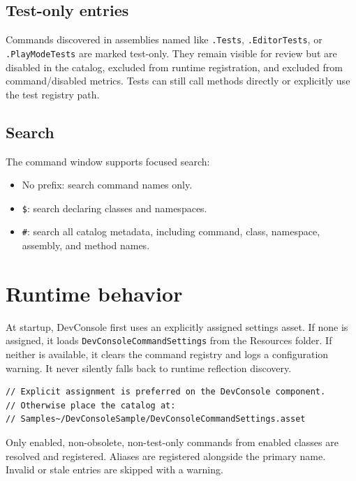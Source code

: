 \documentclass[11pt,a4paper]{article}
\begin{document}
\subsection{Test-only entries}

Commands discovered in assemblies named like \texttt{.Tests}, \texttt{.EditorTests}, or \texttt{.PlayModeTests} are marked test-only. They remain visible for review but are disabled in the catalog, excluded from runtime registration, and excluded from command/disabled metrics. Tests can still call methods directly or explicitly use the test registry path.

\subsection{Search}

The command window supports focused search:

\begin{itemize}[leftmargin=*]
  \item No prefix: search command names only.
  \item \texttt{\$}: search declaring classes and namespaces.
  \item \texttt{\#}: search all catalog metadata, including command, class, namespace, assembly, and method names.
\end{itemize}

\section{Runtime behavior}

At startup, DevConsole first uses an explicitly assigned settings asset. If none is assigned, it loads \texttt{DevConsoleCommandSettings} from the Resources folder. If neither is available, it clears the command registry and logs a configuration warning. It never silently falls back to runtime reflection discovery.

\begin{lstlisting}[style=csharp]
// Explicit assignment is preferred on the DevConsole component.
// Otherwise place the catalog at:
// Samples~/DevConsoleSample/DevConsoleCommandSettings.asset
\end{lstlisting}

Only enabled, non-obsolete, non-test-only commands from enabled classes are resolved and registered. Aliases are registered alongside the primary name. Invalid or stale entries are skipped with a warning.
\end{document}

